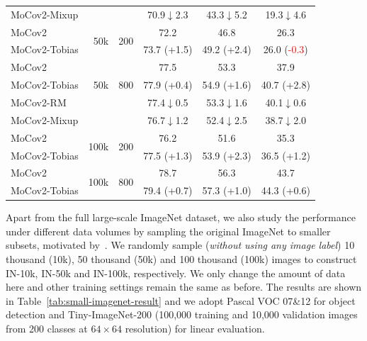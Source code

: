 \documentclass[letterpaper]{article} %
\def\pt{\phantom{0}}
\begin{document}
\begin{table}
\begin{tabular}{l|r|r|c|c|c}
		MoCov2-Mixup&&&70.9\pt$\downarrow$2.3\pt &43.3\pt$\downarrow$5.2\pt &19.3\pt$\downarrow$4.6\pt \\
		\cline{1-6} 
		MoCov2&\multirow{2}{*}{50k} &   \multirow{2}{*}{200}  &          72.2 \pt\pt\pt\pt\pt  &      46.8 \pt\pt\pt\pt\pt              &    26.3 \pt\pt\pt\pt\pt \\
		MoCov2-Tobias& &    &     73.7 (\textcolor{grassgreen}{+1.5})  &  49.2 (\textcolor{grassgreen}{+2.4})     &  26.0 (\textcolor{red}{-0.3})\tiny\pt \\
		\cline{1-6} 
		MoCov2&\multirow{3}{*}{50k} &   \multirow{3}{*}{800}  &          77.5 \pt\pt\pt\pt\pt  &    53.3  \pt\pt\pt\pt\pt              &    37.9 \pt\pt\pt\pt\pt \\
		MoCov2-Tobias& &    &     77.9 (\textcolor{grassgreen}{+0.4})   &        54.9 (\textcolor{grassgreen}{+1.6})     & 40.7 (\textcolor{grassgreen}{+2.8}) \\
		MoCov2-RM&&     &          77.4\pt$\downarrow$0.5\pt     &  53.3\pt$\downarrow$1.6\pt           & 40.1\pt$\downarrow$0.6\pt  \\
		MoCov2-Mixup&&&76.7\pt$\downarrow$1.2\pt &52.4\pt$\downarrow$2.5\pt &38.7\pt$\downarrow$2.0\pt \\
		\cline{1-6} 
		MoCov2&\multirow{2}{*}{100k} &   \multirow{2}{*}{200}  &          76.2 \pt\pt\pt\pt\pt &    51.6  \pt\pt\pt\pt\pt                &  35.3 \pt\pt\pt\pt\pt  \\
		MoCov2-Tobias& &    &     77.5 (\textcolor{grassgreen}{+1.3})    &        53.9 (\textcolor{grassgreen}{+2.3})    &  36.5 (\textcolor{grassgreen}{+1.2}) \\
		\cline{1-6} 
		MoCov2&\multirow{2}{*}{100k} &   \multirow{2}{*}{800}  &          78.7 \pt\pt\pt\pt\pt    &    56.3  \pt\pt\pt\pt\pt                &  43.7 \pt\pt\pt\pt\pt  \\
		MoCov2-Tobias& &    &     79.4 (\textcolor{grassgreen}{+0.7})    &        57.3 (\textcolor{grassgreen}{+1.0})    &  44.3 (\textcolor{grassgreen}{+0.6}) \\
		\hline
	\end{tabular}
\end{table}

Apart from the full large-scale ImageNet dataset, we also study the performance under different data volumes by sampling the original ImageNet to smaller subsets, motivated by~\citet{S3L:cao:arxiv2021}. We randomly sample (\textit{without using any image label}) 10 thousand (10k), 50 thousand (50k) and 100 thousand (100k) images to construct IN-10k, IN-50k and IN-100k, respectively. We only change the amount of data here and other training settings remain the same as before. The results are shown in Table~\ref{tab:small-imagenet-result} and we adopt Pascal VOC 07\&12 for object detection and Tiny-ImageNet-200 (100,000 training and 10,000 validation images from 200 classes at $64 \times 64$ resolution) for linear evaluation. 
\end{document}
